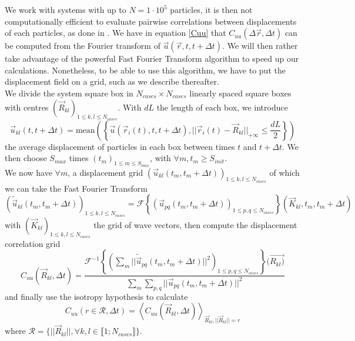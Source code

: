 \documentclass[class=report, float=false, crop=false]{standalone}
\begin{document}

We work with systems with up to $N = 1\cdot10^5$ particles, it is then not computationally efficient to evaluate pairwise correlations between displacements of each particles, as done in \cite{weeks2007short}. We have in equation \ref{Cuu} that $C_{uu}(\Delta \vec{r}, \Delta t)$ can be computed from the Fourier transform of $\vec{u}(\vec{r}, t, t + \Delta t)$. We will then rather take advantage of the powerful Fast Fourier Transform algorithm to speed up our calculations. Nonetheless, to be able to use this algorithm, we have to put the displacement field on a grid, such as we describe thereafter.\\

We divide the system square box in $N_{cases} \times N_{cases}$ linearly spaced square boxes with centres $(\vec{R}_{kl})_{1 \leq k, l \leq N_{cases}}$. With $dL$ the length of each box, we introduce
\begin{equation}
\vec{u}_{kl}(t, t + \Delta t) = \text{mean}\left(\left\{\vec{u}(\vec{r}_i(t), t, t + \Delta t), ||\vec{r}_i(t) - \vec{R}_{kl}||_{+\infty} \leq \frac{dL}{2}\right\}\right)
\label{u_to_grid}
\end{equation}
the average displacement of particles in each box between times $t$ and $t + \Delta t$. We then choose $S_{max}$ times $(t_m)_{1 \leq m \leq S_{max}}$, with $\forall m, t_m \geq S_{init}$.\\

We now have $\forall m$, a displacement grid $(\vec{u}_{kl}(t_m, t_m + \Delta t))_{1 \leq k, l \leq N_{cases}}$ of which we can take the Fast Fourier Transform
\begin{equation}
(\tilde{\vec{u}}_{kl}(t_m, t_m + \Delta t))_{1 \leq k, l \leq N_{cases}} = \mathcal{F}\left\{(\vec{u}_{pq}(t_m, t_m + \Delta t))_{1 \leq p, q \leq N_{cases}}\right\}(\vec{K}_{kl}, t_m, t_m + \Delta t)
\end{equation}
with $(\vec{K}_{kl})_{1 \leq k, l \leq N_{cases}}$ the grid of wave vectors, then compute the displacement correlation grid
\begin{equation}
C_{uu}(\vec{R}_{kl}, \Delta t) = \frac{\mathcal{F}^{-1}\left\{\left(\sum_m ||\tilde{\vec{u}}_{pq}(t_m, t_m + \Delta t)||^2\right)_{1 \leq p, q \leq N_{cases}}\right\}(\vec{R_{kl})}}{\sum_m\sum_{p, q} ||\vec{u}_{pq}(t_m, t_m + \Delta t)||^2}
\end{equation}
and finally use the isotropy hypothesis to calculate
\begin{equation}
C_{uu}(r \in \mathcal{R}, \Delta t) = \left<C_{uu}(\vec{R}_{kl}, \Delta t)\right>_{\vec{R}_{kl}, ||\vec{R}_{kl}||=r}
\end{equation}
where $\mathcal{R} = \{||\vec{R}_{kl}||, \forall k, l \in \llbracket 1 ; N_{cases} \rrbracket\}$.\\
\end{document}
